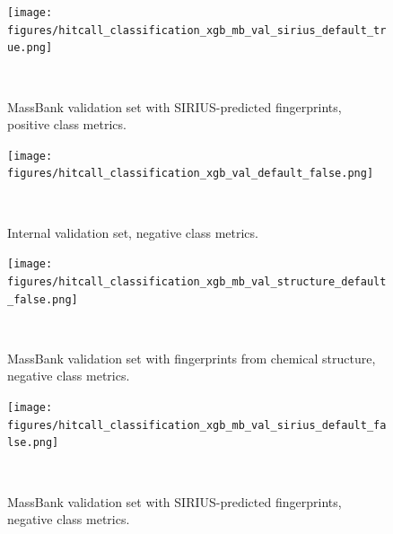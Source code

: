 \begin{figure}
  \centering
  \texttt{[image: figures/hitcall\_classification\_xgb\_mb\_val\_sirius\_default\_true.png]}
  \caption{MassBank validation set with SIRIUS-predicted fingerprints, positive class metrics.}
~\label{fig:hitcall_classification_xgb_mb_val_sirius_default_true}
\end{figure}


\begin{figure}
  \centering
  \texttt{[image: figures/hitcall\_classification\_xgb\_val\_default\_false.png]}
  \caption{Internal validation set, negative class metrics.}
~\label{fig:hitcall_classification_xgb_val_default_false}
\end{figure}

\begin{figure}
  \centering
  \texttt{[image: figures/hitcall\_classification\_xgb\_mb\_val\_structure\_default\_false.png]}
  \caption{MassBank validation set with fingerprints from chemical structure, negative class metrics.}
~\label{fig:hitcall_classification_xgb_mb_val_structure_default_false}
\end{figure}

\begin{figure}
  \centering
  \texttt{[image: figures/hitcall\_classification\_xgb\_mb\_val\_sirius\_default\_false.png]}
  \caption{MassBank validation set with SIRIUS-predicted fingerprints, negative class metrics.}
~\label{fig:hitcall_classification_xgb_mb_val_sirius_default_false}
\end{figure}



\newpage

